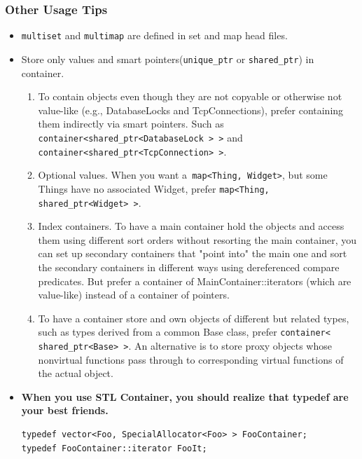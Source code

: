 \documentclass[a4paper,11pt,twoside]{book}
\begin{document}
\subsubsection{Other Usage Tips}
\begin{itemize}
	
	
\item \texttt{multiset} and \texttt{multimap} are defined in set and map head files.

\item Store only values and smart pointers(\texttt{unique\_ptr} or \texttt{shared\_ptr}) in container.

\begin{enumerate}
	\item To contain objects even though they are not copyable or otherwise not value-like (e.g., DatabaseLocks and
	TcpConnections), prefer containing them indirectly via smart pointers. Such as
	\texttt{container<shared\_ptr<DatabaseLock > >} and \\
	\texttt{container<shared\_ptr<TcpConnection> >}.
	
	\item Optional values. When you want a\texttt{ map<Thing, Widget>}, but some Things have no associated Widget, prefer \texttt{map<Thing, shared\_ptr<Widget> >}.
	
	\item Index containers. To have a main container hold the objects and access them using different sort orders without resorting the main container, you can set up secondary containers that "point into" the main one and sort the secondary containers in different ways using dereferenced compare predicates. But prefer a container of MainContainer::iterators (which are value-like) instead of a container of pointers.
	
	\item To have a container store and own objects of different but related types, such as types derived from a common Base class, prefer \texttt{container< shared\_ptr<Base> >}. An alternative is to store proxy objects whose nonvirtual functions pass through to corresponding virtual functions of the actual object.
\end{enumerate}



\item \textbf{When you use STL Container, you should realize that typedef are your best friends.}
\begin{lstlisting}[numbers=none]
typedef vector<Foo, SpecialAllocator<Foo> > FooContainer;
typedef FooContainer::iterator FooIt;


\end{lstlisting}
\end{itemize}
\end{document}
